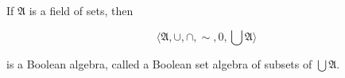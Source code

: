 If $\mathfrak{A}$ is a field of sets, then

$$\langle \mathfrak{A}, \cup, \cap, \sim, 0, \bigcup \mathfrak{A} \rangle$$

is a Boolean algebra, called a Boolean set algebra of subsets of $\bigcup \mathfrak{A}$.
